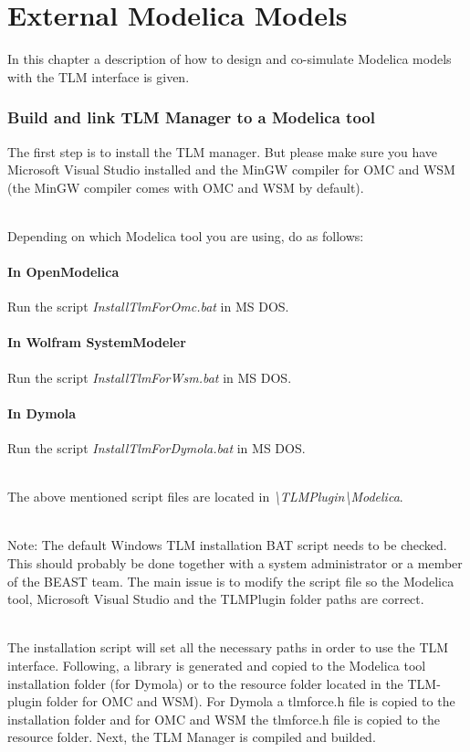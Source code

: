 \chapter{External Modelica Models}

In this chapter a description of how to design and co-simulate Modelica models with the TLM interface is given.

\subsection{Build and link TLM Manager to a Modelica tool}

The first step is to install the TLM manager. But please make sure you have Microsoft Visual Studio installed and the MinGW compiler for OMC and WSM (the MinGW compiler comes with OMC and WSM by default).

~\\Depending on which Modelica tool you are using, do as follows:

\subsubsection{In OpenModelica}
Run the script \textit{InstallTlmForOmc.bat} in MS DOS.

\subsubsection{In Wolfram SystemModeler}
Run the script \textit{InstallTlmForWsm.bat} in MS DOS.

\subsubsection{In Dymola}
Run the script \textit{InstallTlmForDymola.bat} in MS DOS.

~\\The above mentioned script files are located in \textit{\textbackslash TLMPlugin\textbackslash Modelica}.

~\\Note: The default Windows TLM installation BAT script needs to be checked.
This should probably be done together with a system administrator or a member of the BEAST team. The main issue is to modify the script file so the Modelica tool, Microsoft Visual Studio and the TLMPlugin folder paths are correct.

~\\ The installation script will set all the necessary paths in order to use the TLM interface. Following, a library is generated and copied to the Modelica tool installation folder (for Dymola) or to the resource folder located in the TLM-plugin folder for OMC and WSM). For Dymola a tlmforce.h file is copied to the installation folder and for OMC and WSM the tlmforce.h file is copied to the resource folder. Next, the TLM Manager is compiled and builded.

